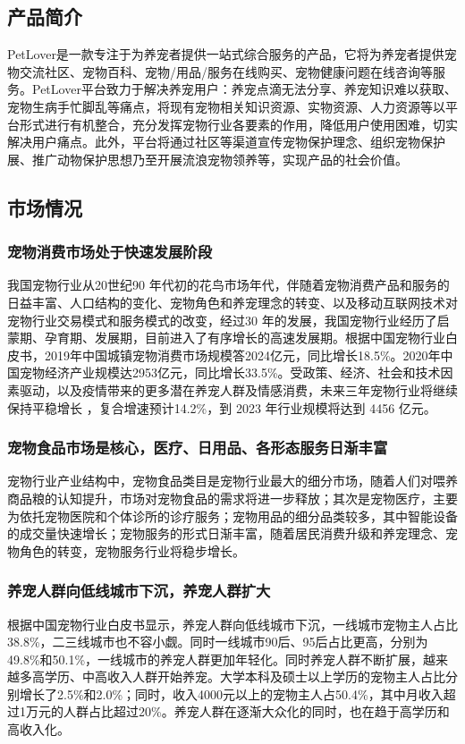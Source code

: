 \documentclass[a4paper]{ctexart}
\begin{document}
\subsection{产品简介}
PetLover是一款专注于为养宠者提供一站式综合服务的产品，它将为养宠者提供宠物交流社区、宠物百科、宠物/用品/服务在线购买、宠物健康问题在线咨询等服务。PetLover平台致力于解决养宠用户：养宠点滴无法分享、养宠知识难以获取、宠物生病手忙脚乱等痛点，将现有宠物相关知识资源、实物资源、人力资源等以平台形式进行有机整合，充分发挥宠物行业各要素的作用，降低用户使用困难，切实解决用户痛点。此外，平台将通过社区等渠道宣传宠物保护理念、组织宠物保护展、推广动物保护思想乃至开展流浪宠物领养等，实现产品的社会价值。

\subsection{市场情况}
\subsubsection{宠物消费市场处于快速发展阶段}
我国宠物行业从20世纪90 年代初的花鸟市场年代，伴随着宠物消费产品和服务的日益丰富、人口结构的变化、宠物角色和养宠理念的转变、以及移动互联网技术对宠物行业交易模式和服务模式的改变，经过30 年的发展，我国宠物行业经历了启蒙期、孕育期、发展期，目前进入了有序增长的高速发展期。根据中国宠物行业白皮书，2019年中国城镇宠物消费市场规模答2024亿元，同比增长18.5\%。2020年中国宠物经济产业规模达2953亿元，同比增长33.5\%。受政策、经济、社会和技术因素驱动，以及疫情带来的更多潜在养宠人群及情感消费，未来三年宠物行业将继续 保持平稳增长 ，复合增速预计14.2\%，到 2023 年行业规模将达到 4456 亿元。
\subsubsection{宠物食品市场是核心，医疗、日用品、各形态服务日渐丰富}
宠物行业产业结构中，宠物食品类目是宠物行业最大的细分市场，随着人们对喂养商品粮的认知提升，市场对宠物食品的需求将进一步释放；其次是宠物医疗，主要为依托宠物医院和个体诊所的诊疗服务；宠物用品的细分品类较多，其中智能设备的成交量快速增长；宠物服务的形式日渐丰富，随着居民消费升级和养宠理念、宠物角色的转变，宠物服务行业将稳步增长。
\subsubsection{养宠人群向低线城市下沉，养宠人群扩大}
根据中国宠物行业白皮书显示，养宠人群向低线城市下沉，一线城市宠物主人占比38.8\%，二三线城市也不容小觑。同时一线城市90后、95后占比更高，分别为49.8\%和50.1\%，一线城市的养宠人群更加年轻化。同时养宠人群不断扩展，越来越多高学历、中高收入人群开始养宠。大学本科及硕士以上学历的宠物主人占比分别增长了2.5\%和2.0\%；同时，收入4000元以上的宠物主人占50.4\%，其中月收入超过1万元的人群占比超过20\%。养宠人群在逐渐大众化的同时，也在趋于高学历和高收入化。
\end{document}
